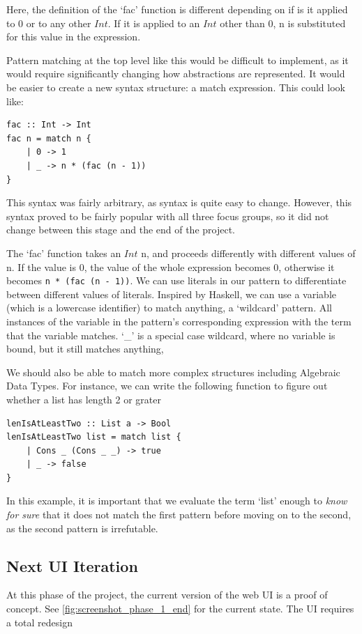 Here, the definition of the `fac' function is different depending on if is it applied to $0$ or to any other $Int$. If it is applied to an $Int$ other than 0, n is substituted for this value in the expression.

Pattern matching at the top level like this would be difficult to implement, as it would require significantly changing how abstractions are represented. It would be easier to create a new syntax structure: a match expression. This could look like:

\begin{lstlisting}[language=SFL]
fac :: Int -> Int
fac n = match n {
    | 0 -> 1
    | _ -> n * (fac (n - 1))
}
\end{lstlisting}
This syntax was fairly arbitrary, as syntax is quite easy to change. However, this syntax proved to be fairly popular with all three focus groups, so it did not change between this stage and the end of the project.

The `fac' function takes an $Int$ n, and proceeds differently with different values of n. If the value is 0, the value of the whole expression becomes 0, otherwise it becomes \lstinline[language=SFL]!n * (fac (n - 1))!. We can use literals in our pattern to differentiate between different values of literals. Inspired by Haskell, we can use a variable (which is a lowercase identifier) to match anything, a `wildcard' pattern. All instances of the variable in the pattern's corresponding expression with the term that the variable matches. `\_' is a special case wildcard, where no variable is bound, but it still matches anything, 

We should also be able to match more complex structures including Algebraic Data Types. For instance, we can write the following function to figure out whether a list has length 2 or grater

\begin{lstlisting}[language=SFL]
lenIsAtLeastTwo :: List a -> Bool
lenIsAtLeastTwo list = match list {
    | Cons _ (Cons _ _) -> true
    | _ -> false
}    
\end{lstlisting}

\noindent In this example, it is important that we evaluate the term `list' enough to \textit{know for sure} that it does not match the first pattern before moving on to the second, as the second pattern is irrefutable. 

\subsection{Next UI Iteration}
\label{c2:next_ui}
At this phase of the project, the current version of the web UI is a proof of concept. See \ref{fig:screenshot_phase_1_end} for the current state. The UI requires a total redesign

